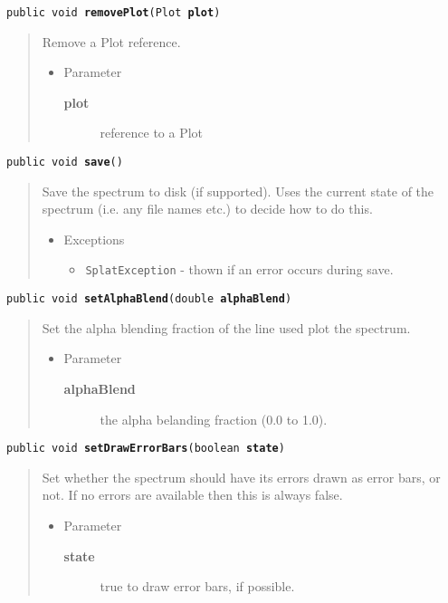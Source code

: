 \documentclass[twoside,11pt,nolof]{starlink}
\providecommand{\method}[1]{\texttt{#1}}
\newenvironment{desc}{\begin{quote}}{\end{quote}}
\begin{document}
\method{public void \textbf{removePlot}(\texttt{Plot} \textbf{plot})\label{l93}\label{l94}}
\begin{desc}Remove a Plot reference.
\begin{itemize}
\item{Parameter
  \begin{description}
   \item[\textbf{plot}]{reference to a Plot}
  \end{description}}
\end{itemize}
\end{desc}

\method{public void \textbf{save}()\label{l95}\label{l96}}
\begin{desc}Save the spectrum to disk (if supported). Uses the current
 state of the spectrum (i.e. any file names etc.) to decide how
 to do this.
\begin{itemize}
\item{{Exceptions}
  \begin{itemize}
   \item{\vspace{-.6ex}\texttt{SplatException} - thown if an error occurs during save.}
  \end{itemize}
}
\end{itemize}
\end{desc}

\method{public void \textbf{setAlphaBlend}(\texttt{double} \textbf{alphaBlend})\label{l97}\label{l98}}
\begin{desc}Set the alpha blending fraction of the line used plot the spectrum.
\begin{itemize}
\item{Parameter
  \begin{description}
   \item[\textbf{alphaBlend}]{the alpha belanding fraction (0.0 to 1.0).}
  \end{description}}
\end{itemize}
\end{desc}

\method{public void \textbf{setDrawErrorBars}(\texttt{boolean} \textbf{state})\label{l99}\label{l100}}
\begin{desc}Set whether the spectrum should have its errors drawn as error
 bars, or not. If no errors are available then this is always
 false.
\begin{itemize}
\item{Parameter
  \begin{description}
   \item[\textbf{state}]{true to draw error bars, if possible.}
  \end{description}}
\end{itemize}
\end{desc}
\end{document}
